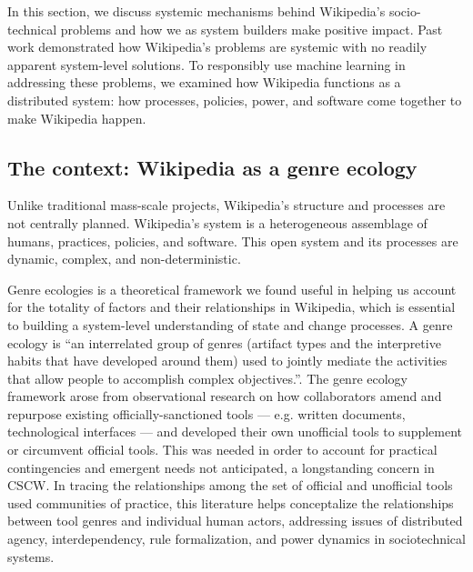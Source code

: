 In this section, we discuss systemic mechanisms behind Wikipedia's socio-technical problems and how we as system builders make positive impact.  Past work demonstrated how Wikipedia's problems are systemic with no readily apparent system-level solutions. To responsibly use machine learning in addressing these problems, we examined how Wikipedia functions as a distributed system: how processes, policies, power, and software come together to make Wikipedia happen.

\subsection{The context: Wikipedia as a genre ecology}
Unlike traditional mass-scale projects, Wikipedia's structure and processes are not centrally planned. Wikipedia's system is a heterogeneous assemblage of humans, practices, policies, and software.  This open system and its processes are dynamic, complex, and non-deterministic.

Genre ecologies is a theoretical framework we found useful in helping us account for the totality of factors and their relationships in Wikipedia, which is essential to building a system-level understanding of state and change processes.  A genre ecology is ``an interrelated group of genres (artifact types and the interpretive habits that have developed around them) used to jointly mediate the activities that allow people to accomplish complex objectives.''\cite{spinuzzi2000genre}. The genre ecology framework arose from observational research on how collaborators amend and repurpose existing officially-sanctioned tools --- e.g. written documents, technological interfaces --- and developed their own unofficial tools to supplement or circumvent official tools. This was needed in order to account for practical contingencies and emergent needs not anticipated, a longstanding concern in CSCW. In tracing the relationships among the set of official and unofficial tools used communities of practice, this literature helps conceptalize the relationships between tool genres and individual human actors, addressing issues of distributed agency, interdependency, rule formalization, and power dynamics in sociotechnical systems\cite{spinuzzi2003tracing}.

